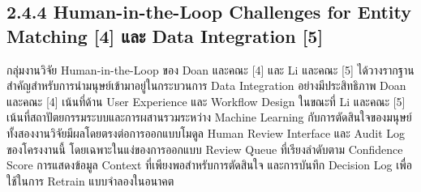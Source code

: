\documentclass[12pt,a4paper]{report}
\begin{document}
\subsection*{2.4.4 Human-in-the-Loop Challenges for Entity Matching [4] และ Data Integration [5]}
กลุ่มงานวิจัย Human-in-the-Loop ของ Doan และคณะ [4] และ Li และคณะ [5] ได้วางรากฐานสำคัญสำหรับการนำมนุษย์เข้ามาอยู่ในกระบวนการ Data Integration อย่างมีประสิทธิภาพ Doan และคณะ [4] เน้นที่ด้าน User Experience และ Workflow Design ในขณะที่ Li และคณะ [5] เน้นที่สถาปัตยกรรมระบบและการผสานรวมระหว่าง Machine Learning กับการตัดสินใจของมนุษย์ ทั้งสองงานวิจัยมีผลโดยตรงต่อการออกแบบโมดูล Human Review Interface และ Audit Log ของโครงงานนี้ โดยเฉพาะในแง่ของการออกแบบ Review Queue ที่เรียงลำดับตาม Confidence Score การแสดงข้อมูล Context ที่เพียงพอสำหรับการตัดสินใจ และการบันทึก Decision Log เพื่อใช้ในการ Retrain แบบจำลองในอนาคต\par
\end{document}
